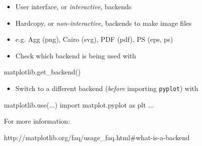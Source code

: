 \documentclass[11pt]{article}
\providecommand{\tightlist}{%
      \setlength{\itemsep}{0pt}\setlength{\parskip}{0pt}}
\newenvironment{Shaded}{}{}
\newcommand{\NormalTok}[1]{{#1}}
\newcommand{\ImportTok}[1]{{#1}}
\begin{document}
\begin{itemize}
\item
  User interface, or \emph{interactive}, backends
\item
  Hardcopy, or \emph{non-interactive}, backends to make image files
\item
  e.g. Agg (png), Cairo (svg), PDF (pdf), PS (eps, ps)
\item
  Check which backend is being used with
\end{itemize}

\begin{Shaded}
\begin{Highlighting}[]
\NormalTok{matplotlib.get_backend()}
\end{Highlighting}
\end{Shaded}

\begin{itemize}
\tightlist
\item
  Switch to a different backend (\emph{before} importing
  \texttt{pyplot}) with
\end{itemize}

\begin{Shaded}
\begin{Highlighting}[]
\NormalTok{matplotlib.use(...)}
\ImportTok{import} \NormalTok{matplot.pyplot }\ImportTok{as} \NormalTok{plt}
\NormalTok{...}
\end{Highlighting}
\end{Shaded}

For more information:

http://matplotlib.org/faq/usage\_faq.html\#what-is-a-backend


    
    
    
    
\end{document}
